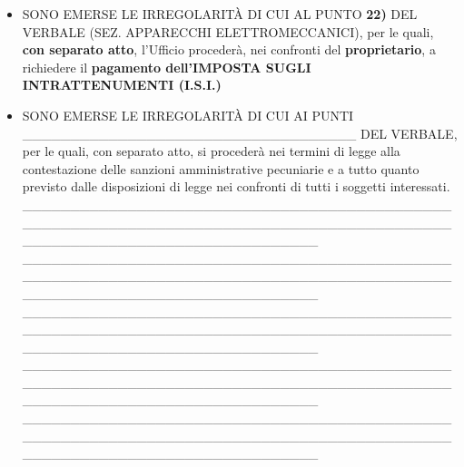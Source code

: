 \documentclass[12pt]{article}
\begin{document}
\begin{itemize}
\_\_\_\_\_\_\_\_\_\_\_\_\_\_\_\_\_\_\_\_\_\_\_\_\_\_\_\_\_\_\_\_\_\_\_\_\_\_\_\_\_\_\_\_\_\_\_\_\_\_\_\_\_\_\_\_\_\_\_\_\_\_\_\_\_\_\_\_\_\_\_\_\_\_\_\_\_\_\_\_\_\_\_\_\_\_\_\_\_\_\_\_\_\_\_\_\_\_\_\_\_\_\_\_\_\_\_\_\_\_\_\_\_\_\_\_\_\_\_\_\_ \\
\_\_\_\_\_\_\_\_\_\_\_\_\_\_\_\_\_\_\_\_\_\_\_\_\_\_\_\_\_\_\_\_\_\_\_\_\_\_\_\_\_\_\_\_\_\_\_\_\_\_\_\_\_\_\_\_\_\_\_\_\_\_\_\_\_\_\_\_\_\_\_\_\_\_\_\_\_\_\_\_\_\_\_\_\_\_\_\_\_\_\_\_\_\_\_\_\_\_\_\_\_\_\_\_\_\_\_\_\_\_\_\_\_\_\_\_\_\_\_\_\_ \\
\item SONO EMERSE LE IRREGOLARITÀ DI CUI AL PUNTO \textbf{22)} DEL VERBALE (SEZ. APPARECCHI ELETTROMECCANICI), per le quali, \textbf{con separato atto}, l’Ufficio procederà, nei confronti del \textbf{proprietario}, a richiedere il \textbf{pagamento dell’IMPOSTA SUGLI INTRATTENUMENTI (I.S.I.)} 
\item SONO EMERSE LE IRREGOLARITÀ DI CUI AI PUNTI \_\_\_\_\_\_\_\_\_\_\_\_\_\_\_\_\_\_\_\_\_\_\_\_\_\_\_\_\_\_\_\_\_\_\_ DEL VERBALE, per le quali, con separato atto, si procederà nei termini di legge alla contestazione delle sanzioni amministrative pecuniarie e a tutto quanto previsto dalle disposizioni di legge nei confronti di tutti i soggetti interessati.\\
\_\_\_\_\_\_\_\_\_\_\_\_\_\_\_\_\_\_\_\_\_\_\_\_\_\_\_\_\_\_\_\_\_\_\_\_\_\_\_\_\_\_\_\_\_\_\_\_\_\_\_\_\_\_\_\_\_\_\_\_\_\_\_\_\_\_\_\_\_\_\_\_\_\_\_\_\_\_\_\_\_\_\_\_\_\_\_\_\_\_\_\_\_\_\_\_\_\_\_\_\_\_\_\_\_\_\_\_\_\_\_\_\_\_\_\_\_\_\_\_\_ \\
\_\_\_\_\_\_\_\_\_\_\_\_\_\_\_\_\_\_\_\_\_\_\_\_\_\_\_\_\_\_\_\_\_\_\_\_\_\_\_\_\_\_\_\_\_\_\_\_\_\_\_\_\_\_\_\_\_\_\_\_\_\_\_\_\_\_\_\_\_\_\_\_\_\_\_\_\_\_\_\_\_\_\_\_\_\_\_\_\_\_\_\_\_\_\_\_\_\_\_\_\_\_\_\_\_\_\_\_\_\_\_\_\_\_\_\_\_\_\_\_\_ \\
\_\_\_\_\_\_\_\_\_\_\_\_\_\_\_\_\_\_\_\_\_\_\_\_\_\_\_\_\_\_\_\_\_\_\_\_\_\_\_\_\_\_\_\_\_\_\_\_\_\_\_\_\_\_\_\_\_\_\_\_\_\_\_\_\_\_\_\_\_\_\_\_\_\_\_\_\_\_\_\_\_\_\_\_\_\_\_\_\_\_\_\_\_\_\_\_\_\_\_\_\_\_\_\_\_\_\_\_\_\_\_\_\_\_\_\_\_\_\_\_\_ \\
\_\_\_\_\_\_\_\_\_\_\_\_\_\_\_\_\_\_\_\_\_\_\_\_\_\_\_\_\_\_\_\_\_\_\_\_\_\_\_\_\_\_\_\_\_\_\_\_\_\_\_\_\_\_\_\_\_\_\_\_\_\_\_\_\_\_\_\_\_\_\_\_\_\_\_\_\_\_\_\_\_\_\_\_\_\_\_\_\_\_\_\_\_\_\_\_\_\_\_\_\_\_\_\_\_\_\_\_\_\_\_\_\_\_\_\_\_\_\_\_\_ \\
\_\_\_\_\_\_\_\_\_\_\_\_\_\_\_\_\_\_\_\_\_\_\_\_\_\_\_\_\_\_\_\_\_\_\_\_\_\_\_\_\_\_\_\_\_\_\_\_\_\_\_\_\_\_\_\_\_\_\_\_\_\_\_\_\_\_\_\_\_\_\_\_\_\_\_\_\_\_\_\_\_\_\_\_\_\_\_\_\_\_\_\_\_\_\_\_\_\_\_\_\_\_\_\_\_\_\_\_\_\_\_\_\_\_\_\_\_\_\_\_\_ \\

\end{itemize}
\end{document}
